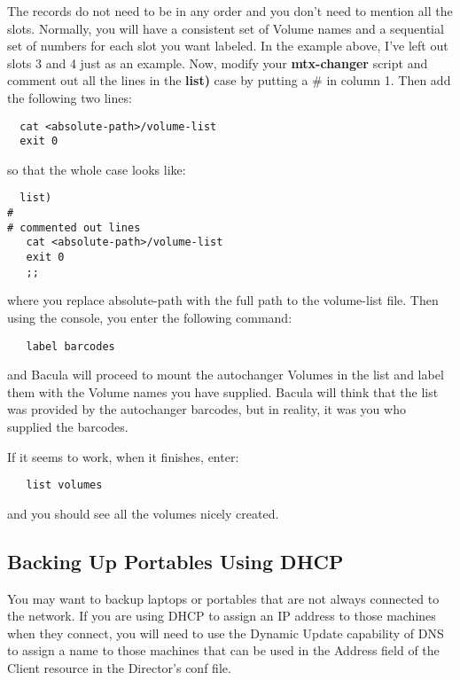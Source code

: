 {The records do not need to be in any order and you don't need to mention all
the slots. Normally, you will have a consistent set of Volume names and a
sequential set of numbers for each slot you want labeled. In the example
above, I've left out slots 3 and 4 just as an example. Now, modify your {\bf
mtx-changer} script and comment out all the lines in the {\bf list)} case by
putting a \# in column 1. Then add the following two lines: 

\footnotesize
\begin{verbatim}
  cat <absolute-path>/volume-list
  exit 0
\end{verbatim}
\normalsize

so that the whole case looks like: 

\footnotesize
\begin{verbatim}
  list)
#
# commented out lines
   cat <absolute-path>/volume-list
   exit 0
   ;;
\end{verbatim}
\normalsize

where you replace \lt{}absolute-path\gt{} with the full path to the
volume-list file. Then using the console, you enter the following command: 

\footnotesize
\begin{verbatim}
   label barcodes
\end{verbatim}
\normalsize

and Bacula will proceed to mount the autochanger Volumes in the list and label
them with the Volume names you have supplied. Bacula will think that the list
was provided by the autochanger barcodes, but in reality, it was you who
supplied the \lt{}barcodes\gt{}. 

If it seems to work, when it finishes, enter: 

\footnotesize
\begin{verbatim}
   list volumes
\end{verbatim}
\normalsize

and you should see all the volumes nicely created. 

\subsection*{Backing Up Portables Using DHCP}
\label{DNS}

You may want to backup laptops or portables that are not always connected to
the network. If you are using DHCP to assign an IP address to those machines
when they connect, you will need to use the Dynamic Update capability of DNS
to assign a name to those machines that can be used in the Address field of
the Client resource in the Director's conf file. 

}
